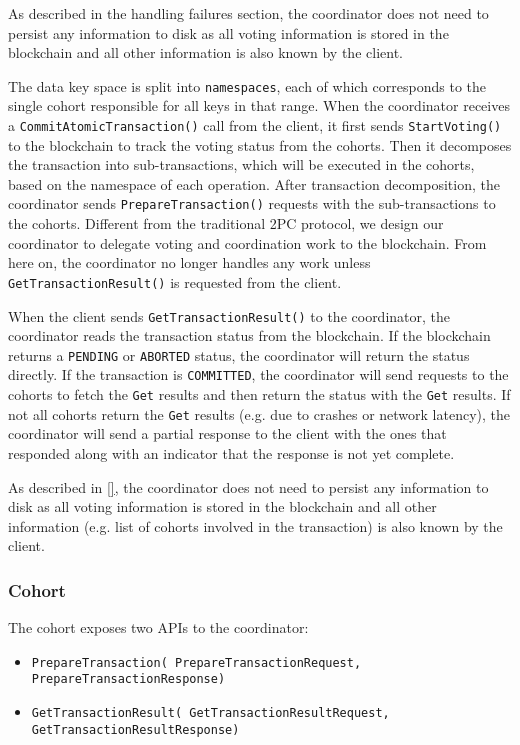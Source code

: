 \documentclass[11pt,conference]{IEEEtran}
\begin{document}
As described in the handling failures section, the coordinator does not need to persist any information to disk as all voting information is stored in the blockchain and all other information is also known by the client.

The data key space is split into \texttt{namespaces}, each of which corresponds to the single cohort responsible for all keys in that range. When the coordinator receives a \texttt{CommitAtomicTransaction()} call from the client, it first sends \texttt{StartVoting()} to the blockchain to track the voting status from the cohorts. Then it decomposes the transaction into sub-transactions, which will be executed in the cohorts, based on the namespace of each operation. After transaction decomposition, the coordinator sends \texttt{PrepareTransaction()} requests with the sub-transactions to the cohorts. Different from the traditional 2PC protocol, we design our coordinator to delegate voting and coordination work to the blockchain. From here on, the coordinator no longer handles any work unless \texttt{GetTransactionResult()} is requested from the client.

When the client sends \texttt{GetTransactionResult()} to the coordinator, the coordinator reads the transaction status from the blockchain. If the blockchain returns a \texttt{PENDING} or \texttt{ABORTED} status, the coordinator will return the status directly. If the transaction is \texttt{COMMITTED}, the coordinator will send requests to the cohorts to fetch the \texttt{Get} results and then return the status with the \texttt{Get} results. If not all cohorts return the \texttt{Get} results (e.g. due to crashes or network latency), the coordinator will send a partial response to the client with the ones that responded along with an indicator that the response is not yet complete.

As described in \ref{}, the coordinator does not need to persist any information to disk as all voting information is stored in the blockchain and all other information (e.g. list of cohorts involved in the transaction) is also known by the client.

\subsubsection{Cohort} \label{cohort}
The cohort exposes two APIs to the coordinator:
\begin{itemize}
  \item \texttt{PrepareTransaction(
    PrepareTransactionRequest, PrepareTransactionResponse)}
  \item \texttt{GetTransactionResult(
    GetTransactionResultRequest, GetTransactionResultResponse)}
\end{itemize} 
\end{document}
